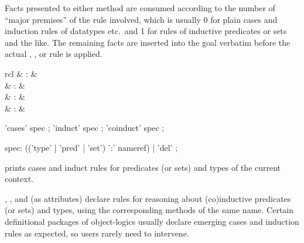 \begin{isabellebody}
\begin{isamarkuptext}
  \medskip Facts presented to either method are consumed according to
  the number of ``major premises'' of the rule involved, which is
  usually 0 for plain cases and induction rules of datatypes etc.\ and
  1 for rules of inductive predicates or sets and the like.  The
  remaining facts are inserted into the goal verbatim before the
  actual , , or  rule is
  applied.%
\end{isamarkuptext}%
\isamarkuptrue%
%
\isamarkuptrue%
%
\begin{isamarkuptext}%
\begin{matharray}{rcl}
    \hypertarget{command.print-induct-rules}{\hyperlink{command.print-induct-rules}{\mbox{}}}\isa{{\isachardoublequote}\isactrlsup {\isacharasterisk}{\isachardoublequote}} & : &  \\
    \hypertarget{attribute.cases}{\hyperlink{attribute.cases}{\mbox{}}} & : &  \\
    \hypertarget{attribute.induct}{\hyperlink{attribute.induct}{\mbox{}}} & : &  \\
    \hypertarget{attribute.coinduct}{\hyperlink{attribute.coinduct}{\mbox{}}} & : &  \\
  \end{matharray}

  \begin{rail}
    'cases' spec
    ;
    'induct' spec
    ;
    'coinduct' spec
    ;

    spec: (('type' | 'pred' | 'set') ':' nameref) | 'del'
    ;
  \end{rail}

  \begin{description}

  \item \hyperlink{command.print-induct-rules}{\mbox{}} prints cases and induct rules
  for predicates (or sets) and types of the current context.
  
  \item \hyperlink{attribute.cases}{\mbox{}}, \hyperlink{attribute.induct}{\mbox{}}, and \hyperlink{attribute.coinduct}{\mbox{}} (as attributes) declare rules for reasoning about
  (co)inductive predicates (or sets) and types, using the
  corresponding methods of the same name.  Certain definitional
  packages of object-logics usually declare emerging cases and
  induction rules as expected, so users rarely need to intervene.


\end{description}
\end{isamarkuptext}
\end{isabellebody}
